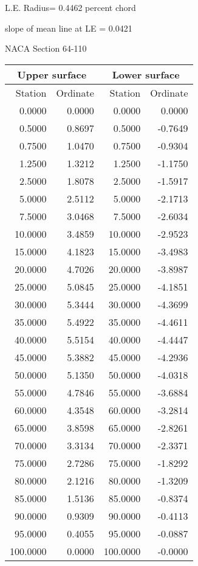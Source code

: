 \documentclass[11pt]{book}
\begin{document}
L.E. Radius=  0.4462 percent chord


 slope of mean line at LE =  0.0421
 \newpage
  \label{s64-110}
 \begin{Large}
 NACA Section 64-110
 \end{Large}
  
 \vspace{8mm}
 \begin{tabular}{|r|r|r|r|} \hline 
 \multicolumn{2}{|c|}{Upper surface} & \multicolumn{2}{|c|}{Lower surface} \\
 \hline
 Station & Ordinate & Station & Ordinate \\
 \hline
0.0000 & 0.0000 & 0.0000 & 0.0000 \\
0.5000 & 0.8697 & 0.5000 & -0.7649 \\
0.7500 & 1.0470 & 0.7500 & -0.9304 \\
1.2500 & 1.3212 & 1.2500 & -1.1750 \\
2.5000 & 1.8078 & 2.5000 & -1.5917 \\
5.0000 & 2.5112 & 5.0000 & -2.1713 \\
7.5000 & 3.0468 & 7.5000 & -2.6034 \\
10.0000 & 3.4859 & 10.0000 & -2.9523 \\
15.0000 & 4.1823 & 15.0000 & -3.4983 \\
20.0000 & 4.7026 & 20.0000 & -3.8987 \\
25.0000 & 5.0845 & 25.0000 & -4.1851 \\
30.0000 & 5.3444 & 30.0000 & -4.3699 \\
35.0000 & 5.4922 & 35.0000 & -4.4611 \\
40.0000 & 5.5154 & 40.0000 & -4.4447 \\
45.0000 & 5.3882 & 45.0000 & -4.2936 \\
50.0000 & 5.1350 & 50.0000 & -4.0318 \\
55.0000 & 4.7846 & 55.0000 & -3.6884 \\
60.0000 & 4.3548 & 60.0000 & -3.2814 \\
65.0000 & 3.8598 & 65.0000 & -2.8261 \\
70.0000 & 3.3134 & 70.0000 & -2.3371 \\
75.0000 & 2.7286 & 75.0000 & -1.8292 \\
80.0000 & 2.1216 & 80.0000 & -1.3209 \\
85.0000 & 1.5136 & 85.0000 & -0.8374 \\
90.0000 & 0.9309 & 90.0000 & -0.4113 \\
95.0000 & 0.4055 & 95.0000 & -0.0887 \\
100.0000 & 0.0000 & 100.0000 & -0.0000 \\
 \hline 
 \end{tabular}
\end{document}
